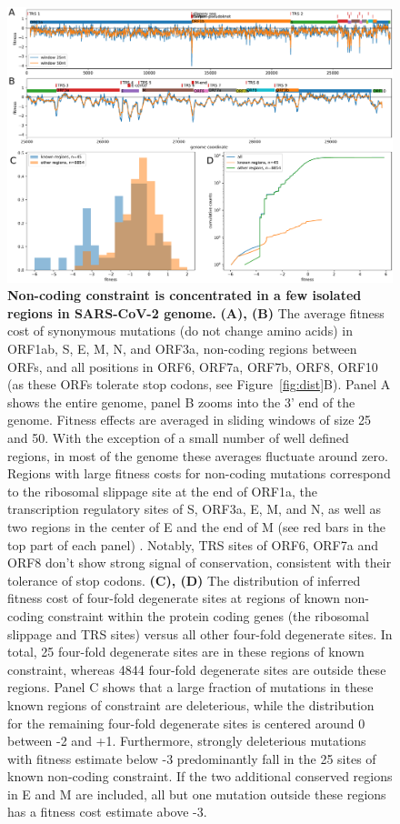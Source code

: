 \documentclass[9pt,twocolumn,twoside]{gsajnl_modified}
\begin{document}
\begin{figure}
\centering
\includegraphics[width=\linewidth]{figs/synonymous_constraint_figure.pdf}
\caption{
{\bf Non-coding constraint is concentrated in a few isolated regions in SARS-CoV-2 genome.}
{\bf (A), (B)} The average fitness cost of synonymous mutations (do not change amino acids) in ORF1ab, S, E, M, N, and ORF3a, non-coding regions between ORFs, and all positions in ORF6, ORF7a, ORF7b, ORF8, ORF10 (as these ORFs tolerate stop codons, see Figure~\ref{fig:dist}B).
Panel A shows the entire genome, panel B zooms into the 3' end of the genome.
Fitness effects are averaged in sliding windows of size 25 and 50.
With the exception of a small number of well defined regions, in most of the genome these averages fluctuate around zero.
Regions with large fitness costs for non-coding mutations correspond to the ribosomal slippage site at the end of ORF1a, the transcription regulatory sites of S, ORF3a, E, M, and N, as well as two regions in the center of E and the end of M (see red bars in the top part of each panel) \citep{markov2023evolution}.
Notably, TRS sites of ORF6, ORF7a and ORF8 don't show strong signal of conservation, consistent with their tolerance of stop codons.
{\bf (C), (D)} The distribution of inferred fitness cost of four-fold degenerate sites at regions of known non-coding constraint within the protein coding genes (the ribosomal slippage and TRS sites) versus all other four-fold degenerate sites.
In total, 25 four-fold degenerate sites are in these regions of known constraint, whereas 4844 four-fold degenerate sites are outside these regions.
Panel C shows that a large fraction of mutations in these known regions of constraint are deleterious, while the distribution for the remaining four-fold degenerate sites is centered around 0 between -2 and +1.
Furthermore, strongly deleterious mutations with fitness estimate below -3 predominantly fall in the 25 sites of known non-coding constraint.
If the two additional conserved regions in E and M are included, all but one mutation outside these regions has a fitness cost estimate above -3.
\label{fig:synonymous}
}
\end{figure}
\end{document}

